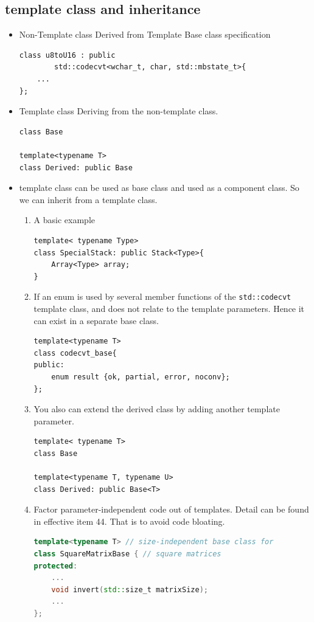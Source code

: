\documentclass[a4paper,11pt,twoside]{book}
\begin{document}
\subsection{template class and inheritance}
\begin{itemize}

	\item Non-Template class Derived from Template Base class specification
\begin{lstlisting}[numbers=none]
class u8toU16 : public 
		std::codecvt<wchar_t, char, std::mbstate_t>{
	...
};
\end{lstlisting}

	\item Template class Deriving from the non-template class.
\begin{lstlisting}[numbers=none]
class Base
	
template<typename T>
class Derived: public Base
\end{lstlisting}	
	
	\item template class can be used as base class and used as a component class. So we can inherit from a template class.
    \begin{enumerate}
        \item A basic example
\begin{lstlisting}[numbers=none]
template< typename Type>
class SpecialStack: public Stack<Type>{
	Array<Type> array;
}
\end{lstlisting}	
	
        \item If an enum is used by several member functions of the \texttt{std::codecvt} template class, and does not relate to the template parameters. Hence it can exist in a separate base class.
	
\begin{lstlisting}[numbers=none]
template<typename T>
class codecvt_base{
public:
	enum result {ok, partial, error, noconv};
};
\end{lstlisting}
	
	\item You also can extend the derived class by adding another template parameter.
\begin{lstlisting}[numbers=none]
template< typename T>
class Base
	
template<typename T, typename U>
class Derived: public Base<T>
\end{lstlisting}
	
	
	\item Factor parameter-independent code out of templates. Detail can be found in effective item 44. That is to avoid code bloating.
\begin{lstlisting}[frame=single, language=c++]
template<typename T> // size-independent base class for
class SquareMatrixBase { // square matrices
protected:
	...
	void invert(std::size_t matrixSize); 
	...
};
	

\end{lstlisting}
\end{enumerate}
\end{itemize}
\end{document}
